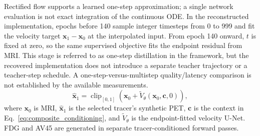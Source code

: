 Rectified flow supports a learned one-step approximation; a single network evaluation is not exact integration of the continuous ODE. In the reconstructed implementation, epochs before 140 sample integer timesteps from 0 to 999 and fit the velocity target $\mathbf{x}_1-\mathbf{x}_0$ at the interpolated input. From epoch 140 onward, $t$ is fixed at zero, so the same supervised objective fits the endpoint residual from MRI. This stage is referred to as one-step distillation in the framework, but the recovered implementation does not introduce a separate teacher trajectory or a teacher-step schedule. A one-step-versus-multistep quality/latency comparison is not established by the available measurements.
\begin{equation}
\widehat{\mathbf{x}}_1=\operatorname{clip}_{[0,1]}\!\left(\mathbf{x}_0+\widetilde{V}_\theta(\mathbf{x}_0,\mathbf{c},0)\right),
\label{eq:onestep_generation}
\end{equation}
where $\mathbf{x}_0$ is MRI, $\widehat{\mathbf{x}}_1$ is the selected tracer's synthetic PET, $\mathbf{c}$ is the context in Eq.~\eqref{eq:composite_conditioning}, and $\widetilde{V}_\theta$ is the endpoint-fitted velocity U-Net. FDG and AV45 are generated in separate tracer-conditioned forward passes.
